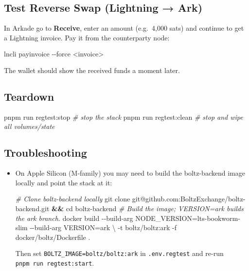 \documentclass[
]{article}
\newenvironment{Shaded}{}{}
\newcommand{\AttributeTok}[1]{\textcolor[rgb]{0.49,0.56,0.16}{#1}}
\newcommand{\BuiltInTok}[1]{\textcolor[rgb]{0.00,0.50,0.00}{#1}}
\newcommand{\CommentTok}[1]{\textcolor[rgb]{0.38,0.63,0.69}{\textit{#1}}}
\newcommand{\DataTypeTok}[1]{\textcolor[rgb]{0.56,0.13,0.00}{#1}}
\newcommand{\ExtensionTok}[1]{#1}
\newcommand{\FunctionTok}[1]{\textcolor[rgb]{0.02,0.16,0.49}{#1}}
\newcommand{\KeywordTok}[1]{\textcolor[rgb]{0.00,0.44,0.13}{\textbf{#1}}}
\newcommand{\NormalTok}[1]{#1}
\newcommand{\OperatorTok}[1]{\textcolor[rgb]{0.40,0.40,0.40}{#1}}
\begin{document}
\hypertarget{test-reverse-swap-lightning-ark}{%
\subsection{Test Reverse Swap (Lightning →
Ark)}\label{test-reverse-swap-lightning-ark}}

In Arkade go to \textbf{Receive}, enter an amount (e.g.~4,000 sats) and
continue to get a Lightning invoice. Pay it from the counterparty node:

\begin{Shaded}
\begin{Highlighting}[]
\ExtensionTok{lncli}\NormalTok{ payinvoice }\AttributeTok{{-}{-}force} \OperatorTok{\textless{}}\NormalTok{invoice}\OperatorTok{\textgreater{}}
\end{Highlighting}
\end{Shaded}

The wallet should show the received funds a moment later.

\hypertarget{teardown}{%
\subsection{Teardown}\label{teardown}}

\begin{Shaded}
\begin{Highlighting}[]
\ExtensionTok{pnpm}\NormalTok{ run regtest:stop     }\CommentTok{\# stop the stack}
\ExtensionTok{pnpm}\NormalTok{ run regtest:clean    }\CommentTok{\# stop and wipe all volumes/state}
\end{Highlighting}
\end{Shaded}

\hypertarget{troubleshooting}{%
\subsection{Troubleshooting}\label{troubleshooting}}

\begin{itemize}
\item
  On Apple Silicon (M-family) you may need to build the boltz-backend
  image locally and point the stack at it:

\begin{Shaded}
\begin{Highlighting}[]
\CommentTok{\# Clone boltz{-}backend locally}
\FunctionTok{git}\NormalTok{ clone git@github.com:BoltzExchange/boltz{-}backend.git }\KeywordTok{\&\&} \BuiltInTok{cd}\NormalTok{ boltz{-}backend}
\CommentTok{\# Build the image; VERSION=ark builds the ark branch.}
\ExtensionTok{docker}\NormalTok{ build }\AttributeTok{{-}{-}build{-}arg}\NormalTok{ NODE\_VERSION=lts{-}bookworm{-}slim }\AttributeTok{{-}{-}build{-}arg}\NormalTok{ VERSION=ark }\DataTypeTok{\textbackslash{}}
  \AttributeTok{{-}t}\NormalTok{ boltz/boltz:ark }\AttributeTok{{-}f}\NormalTok{ docker/boltz/Dockerfile .}
\end{Highlighting}
\end{Shaded}

  Then set \texttt{BOLTZ\_IMAGE=boltz/boltz:ark} in
  \texttt{.env.regtest} and re-run \texttt{pnpm\ run\ regtest:start}.
\end{itemize}
\end{document}
